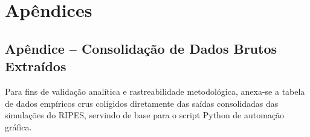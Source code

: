 \documentclass[12pt,a4paper]{article}
\begin{document}
\newpage

\section*{Apêndices}

\subsection*{Apêndice -- Consolidação de Dados Brutos Extraídos}

Para fins de validação analítica e rastreabilidade metodológica, anexa-se a tabela de dados empíricos crus coligidos diretamente das saídas consolidadas das simulações do RIPES, servindo de base para o script Python de automação gráfica.
\end{document}
